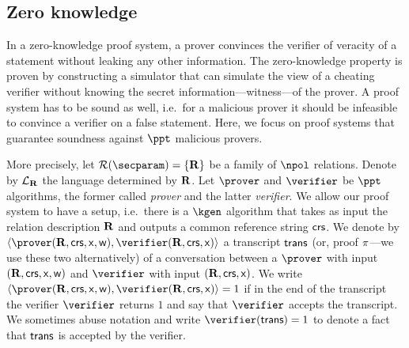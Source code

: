 \let\accentvec\vec \documentclass[runningheads,10pt]{llncs}
\begin{document}
\subsection{Zero knowledge}
In a zero-knowledge proof system, a prover convinces the verifier of
 veracity of a statement without leaking any other information. 
The zero-knowledge property is proven by constructing a simulator that can
simulate the view of a cheating verifier without knowing the secret
information---witness---of the prover.
 A proof system
 has to be sound as well, i.e.~for a malicious prover it should be infeasible
 to convince a verifier on a false statement.
Here, we focus on proof systems that guarantee soundness against $\ppt$
malicious provers.

More precisely, let $\RELGEN(\secparam) = \smallset{\REL}$ be a family of
$\npol$ relations.
Denote by $\mathcal{L}_{\mathbf{R}}$ the language determined by $\mathbf{R}$.
Let $\prover$ and $\verifier$ be $\ppt$ algorithms, the former called \emph{prover}
and the latter \emph{verifier}. We allow our proof system to have a setup,
i.e.~there is a $\kgen$ algorithm that takes as input the relation
description $\mathbf{R}$ and
outputs a common reference string $\mathsf{crs}$.
We denote by $\ip{\prover(\REL, \crs, \inp, \wit)}{\verifier(\REL,
\crs,\inp)}$ a transcript $\mathsf{trans}$ (or, proof $\pi$---we use these two
alternatively) of a conversation between a $\prover$ with input
$(\mathbf{R}, \mathsf{crs}, \mathsf{x}, \mathsf{w})$ and $\verifier$ with input $(\mathbf{R}, \mathsf{crs}, \mathsf{x})$.
We write $\ip{\prover (\REL, \crs, \inp, \wit)}{\verifier(\REL, \crs, \inp)} =
1$ if in the end of the transcript the verifier $\verifier$ returns $1$ and
say that $\verifier$ accepts the transcript. We sometimes abuse notation and
write $\verifier(\trans) = 1$ to denote a fact that $\mathsf{trans}$ is accepted by
the verifier. 
\end{document}
